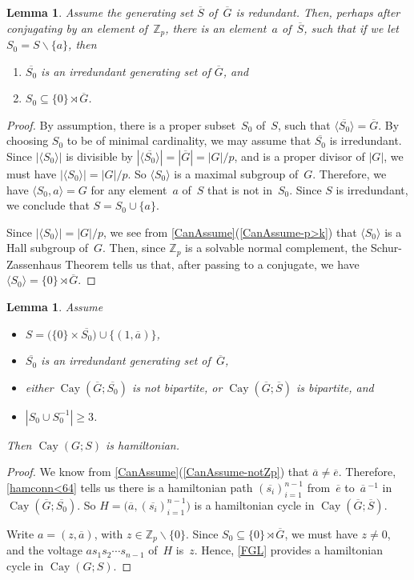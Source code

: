 \documentclass[]{amcjoucc}
\newcommand{\pref}[1]{(\ref{#1})}
\newcommand{\fullcref}[2]{\cref{#1}\pref{#1-#2}}
\theoremstyle{plain}
\newtheorem{lem}[equation]{Lemma}
\theoremstyle{definition}
\theoremstyle{definition}
\DeclareMathOperator{\Cay}{Cay}
\newcommand{\quot}{\overline}
\newcommand{\ZZ}{\mathbb{Z}}
\begin{document}
\begin{lem} \label{S=S0+a}
Assume the generating set $\quot S$ of~$\quot G$ is redundant. Then, perhaps after conjugating by an element of~$\ZZ_p$, there is an element~$a$ of~$\quot S$, such that if we let $S_0 = S \smallsetminus \{a\}$, then 
	\begin{enumerate}
	\item $\quot {S_0}$ is an irredundant generating set of $\quot G$, 
	and
	\item $S_0 \subseteq \{0\} \rtimes \quot G$.
	\end{enumerate}
\end{lem}

\begin{proof}
By assumption, there is a proper subset~$S_0$ of~$S$, such that $\langle \quot{S_0} \rangle = \quot G$. 
By choosing $S_0$ to be of minimal cardinality, we may assume that $\quot {S_0}$ is irredundant. Since $|\langle S_0 \rangle|$ is divisible by $|\langle \quot{S_0} \rangle| = |\quot G| = |G|/p$, and is a proper divisor of $|G|$, we must have $|\langle S_0 \rangle| = |G|/p$. So $\langle S_0 \rangle$ is a maximal subgroup of~$G$. Therefore, we have $\langle S_0, a \rangle = G$ for any element~$a$ of~$S$ that is not in~$S_0$. Since $S$ is irredundant, we conclude that $S = S_0 \cup \{a\}$.

Since $|\langle S_0 \rangle| = |G|/p$, we see from \fullcref{CanAssume}{p>k} that $\langle S_0 \rangle$ is a Hall subgroup of~$G$. Then, since $\ZZ_p$ is a solvable normal complement, the Schur-Zassenhaus Theorem \cite{Wikipedia-SchurZassenhaus} tells us that, after passing to a conjugate, we have $\langle S_0 \rangle = \{0\} \rtimes \quot G$.
\end{proof}

\begin{lem} \label{RedundantByHamConn}
Assume 
	\begin{itemize}
	\item $S = \bigl( \{ 0 \}\times \quot{S_0} \bigr) \cup \{ (1,\quot a) \}$, 
	\item $\quot{S_0}$ is an irredundant generating set of~$\quot G$, 
	\item either $\Cay(\quot G; \quot{S_0})$ is not bipartite, or $\Cay(\quot G; \quot{S})$ is  bipartite,
	and
	\item $|S_0 \cup S_0^{-1}| \ge 3$.
	\end{itemize}
Then $\Cay(G;S)$ is hamiltonian.
\end{lem}

\begin{proof}
We know from \fullcref{CanAssume}{notZp} that $\quot a \neq \quot e$. Therefore, \cref{hamconn<64} tells us there is a hamiltonian path $(\quot{s_i})_{i=1}^{n-1}$ from~$\quot e$ to~$\quot a \, ^{-1}$ in $\Cay(\quot G; \quot{S_0})$. So $H = \bigl( \quot a, (\quot{s_i})_{i=1}^{n-1} \bigr)$ is a hamiltonian cycle in $\Cay(\quot G; \quot S)$.

Write $a = (z, \quot a)$, with $z \in \ZZ_p \smallsetminus \{0\}$. 
Since $S_0  \subseteq \{0\} \rtimes \quot G$, we must have $z \neq 0$, and the voltage $a s_1s_2\cdots s_{n-1}$ of~$H$ is~$z$. Hence, \cref{FGL} provides a hamiltonian cycle in $\Cay(G ; S)$.
\end{proof}
\end{document}
